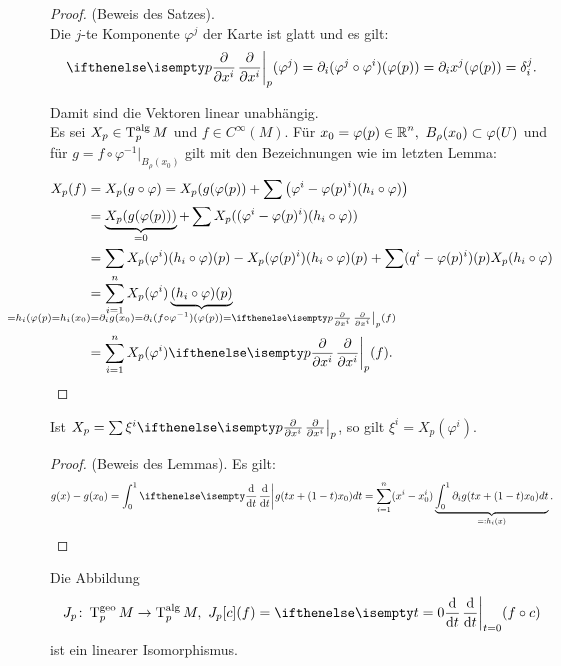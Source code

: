 \begin{proof}
  (Beweis des Satzes).\\

  Die $j$-te Komponente $\varphi^j$ der Karte ist glatt und es gilt:
  \begin{align*}
    \pdifffrac[p]{}{x^i}(\varphi^j) = \partial_i(\varphi^j \circ \varphi^i)(\varphi(p)) = \partial_ix^j(\varphi(p)) = \delta_i^j.
  \end{align*}

  Damit sind die Vektoren linear unabhängig.\\

  Es sei $X_p\in \operatorname{T}_p^{\text{alg}}M$ und $f \in C^{\infty}(M)$.
  Für $x_0=\varphi(p) \in \operatorname{\mathbb{R}}^n, \ B_{\rho}(x_0) \subset \varphi(U)$ und für $g = f \circ \varphi^{-1}|_{B_{\rho}(x_0)}$ gilt mit den Bezeichnungen wie im letzten Lemma:
  \begin{align*}
    X_p(f) & = X_p(g \circ \varphi) = X_p(g(\varphi(p)) + \sum \left(\varphi^i - \varphi(p)^i)(h_i \circ \varphi) \right)\\
    & = \underbrace{X_p(g(\varphi(p)))}_{\mathclap{=0}} + \sum X_p((\varphi^i-\varphi(p)^i)(h_i \circ \varphi))\\
    & = \sum X_p(\varphi^i)(h_i\circ\varphi)(p) - X_p(\varphi(p)^i)(h_i\circ \varphi)(p) + \sum (q^i-\varphi(p)^i)(p) X_p(h_i \circ \varphi)\\
    & = \sum_{i=1}^n X_p(\varphi^i)\underbrace{(h_i \circ \varphi)(p)}_{\mathclap{=h_i(\varphi(p) = h_i(x_0) = \partial_ig(x_0) = \partial_i(f\circ \varphi^{-1})(\varphi(p)) = \pdifffrac[p]{}{x^i}(f)}}\\
    & = \sum_{i=1}^nX_p(\varphi^i)\pdifffrac[p]{}{x^i}(f).
  \end{align*}
\end{proof}

\begin{bem}
  Ist $X_p=\sum \xi^i\pdifffrac[p]{}{x^i}$, so gilt $\xi^i = X_p(\varphi^i)$.
\end{bem}

\begin{proof}
  (Beweis des Lemmas). Es gilt:
  \begin{align*}
    g(x) - g(x_0) = \int_0^1\difffrac{}{t}g(tx + (1-t)x_0)dt = \sum_{i=1}^n(x^i-x_0^i)\underbrace{\int_0^1\partial_ig(tx + (1-t)x_0) dt}_{=: h_i(x)}.
  \end{align*}
\end{proof}

\begin{satz}
  Die Abbildung
  \begin{align*}
    J_p \colon \T_p^{\text{geo}}M \to \T_p^{\text{alg}}M, \ J_{p}[c](f) = \difffrac[t=0]{}{t}(f\circ c)
  \end{align*}
  ist ein linearer Isomorphismus.
\end{satz}

